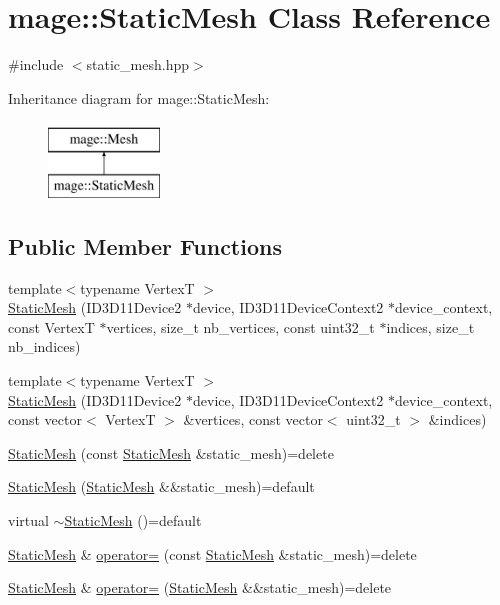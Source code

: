 \hypertarget{classmage_1_1_static_mesh}{}\section{mage\+:\+:Static\+Mesh Class Reference}
\label{classmage_1_1_static_mesh}


{\ttfamily \#include $<$static\+\_\+mesh.\+hpp$>$}

Inheritance diagram for mage\+:\+:Static\+Mesh\+:\begin{figure}[H]
\begin{center}
\leavevmode
\includegraphics[height=2.000000cm]{classmage_1_1_static_mesh}
\end{center}
\end{figure}
\subsection*{Public Member Functions}
\begin{DoxyCompactItemize}
\item 
{\footnotesize template$<$typename VertexT $>$ }\\\hyperlink{classmage_1_1_static_mesh_ab66b5c11fee10d2e7cbe8bdd4b45d6fe}{Static\+Mesh} (I\+D3\+D11\+Device2 $\ast$device, I\+D3\+D11\+Device\+Context2 $\ast$device\+\_\+context, const VertexT $\ast$vertices, size\+\_\+t nb\+\_\+vertices, const uint32\+\_\+t $\ast$indices, size\+\_\+t nb\+\_\+indices)
\item 
{\footnotesize template$<$typename VertexT $>$ }\\\hyperlink{classmage_1_1_static_mesh_ad114fc265795fca5dfd181341b7ccb2e}{Static\+Mesh} (I\+D3\+D11\+Device2 $\ast$device, I\+D3\+D11\+Device\+Context2 $\ast$device\+\_\+context, const vector$<$ VertexT $>$ \&vertices, const vector$<$ uint32\+\_\+t $>$ \&indices)
\item 
\hyperlink{classmage_1_1_static_mesh_a15be69ad312c252c9816a57ec1555d73}{Static\+Mesh} (const \hyperlink{classmage_1_1_static_mesh}{Static\+Mesh} \&static\+\_\+mesh)=delete
\item 
\hyperlink{classmage_1_1_static_mesh_a3841addfb07533099f38602f8728db7e}{Static\+Mesh} (\hyperlink{classmage_1_1_static_mesh}{Static\+Mesh} \&\&static\+\_\+mesh)=default
\item 
virtual \hyperlink{classmage_1_1_static_mesh_a68bab11bb133738f5ebc7ce5579d98d8}{$\sim$\+Static\+Mesh} ()=default
\item 
\hyperlink{classmage_1_1_static_mesh}{Static\+Mesh} \& \hyperlink{classmage_1_1_static_mesh_af73dd102f2de9cf7529e380895cfc8ff}{operator=} (const \hyperlink{classmage_1_1_static_mesh}{Static\+Mesh} \&static\+\_\+mesh)=delete
\item 
\hyperlink{classmage_1_1_static_mesh}{Static\+Mesh} \& \hyperlink{classmage_1_1_static_mesh_a38912f8555053abba649bea160d56e46}{operator=} (\hyperlink{classmage_1_1_static_mesh}{Static\+Mesh} \&\&static\+\_\+mesh)=delete
\end{DoxyCompactItemize}
